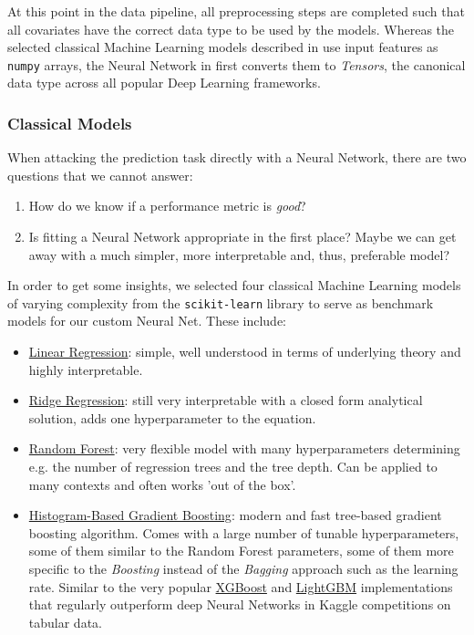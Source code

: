 At this point in the data pipeline, all preprocessing steps are completed such that all covariates have the correct data type to be used by the models.
Whereas the selected classical Machine Learning models described in  use input features as \texttt{numpy} arrays, the Neural Network in  first converts them to \emph{Tensors}, the canonical data type across all popular Deep Learning frameworks.

\subsubsection{Classical Models} \label{classical-models}

When attacking the prediction task directly with a Neural Network, there are two questions that we cannot answer:
\begin{enumerate}
  \item How do we know if a performance metric is \emph{good}?
  \item Is fitting a Neural Network appropriate in the first place?
        Maybe we can get away with a much simpler, more interpretable and, thus, preferable model?
\end{enumerate}
In order to get some insights, we selected four classical Machine Learning models of varying complexity from the \texttt{scikit-learn} library \citep{pedregosa2011} to serve as benchmark models for our custom Neural Net.
These include:
\begin{itemize}
  \item \href{https://scikit-learn.org/stable/modules/generated/sklearn.linear_model.LinearRegression.html}{Linear Regression}: simple, well understood in terms of underlying theory and highly interpretable.
  \item \href{https://scikit-learn.org/stable/modules/generated/sklearn.linear_model.Ridge.html}{Ridge Regression}: still very interpretable with a closed form analytical solution, adds one hyperparameter to the equation.
  \item \href{https://scikit-learn.org/stable/modules/generated/sklearn.ensemble.RandomForestRegressor.html}{Random Forest}: very flexible model with many hyperparameters determining e.g. the number of regression trees and the tree depth.
        Can be applied to many contexts and often works 'out of the box'.
  \item \href{https://scikit-learn.org/stable/modules/generated/sklearn.ensemble.HistGradientBoostingRegressor.html}{Histogram-Based Gradient Boosting}: modern and fast tree-based gradient boosting algorithm.
        Comes with a large number of tunable hyperparameters, some of them similar to the Random Forest parameters, some of them more specific to the \emph{Boosting} instead of the \emph{Bagging} approach such as the learning rate.
        Similar to the very popular \href{https://xgboost.readthedocs.io/en/stable/}{XGBoost} \citep{chen2016} and \href{https://lightgbm.readthedocs.io/en/latest/}{LightGBM} \citep{ke2017} implementations that regularly outperform deep Neural Networks in Kaggle competitions on tabular data.
\end{itemize}

